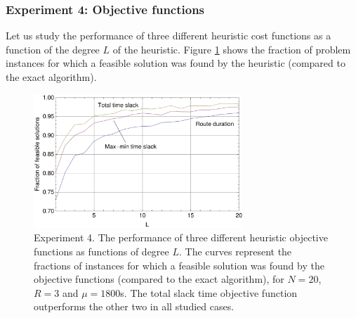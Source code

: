 \documentclass[dissertation,draft*]{aaltoseries}
\begin{document}



\subsubsection{Experiment 4: Objective functions}
Let us study the performance of three different heuristic cost functions %
as a function of the degree $L$ of the heuristic.
Figure \ref{objvertailu01} shows the fraction of problem instances for which a feasible solution was 
found by the heuristic (compared to the exact algorithm). 


\begin{figure}
\centering
\includegraphics[width=0.7\textwidth]{objvertailu01.pdf}
\caption{Experiment 4. The performance of three different heuristic objective functions as functions of degree $L$.
The curves represent the fractions of instances for which a feasible solution was found by the objective functions 
(compared to the exact algorithm), 
for $N=20$, $R=3$ and $\mu=1800$s. The total slack time objective function
outperforms the other two in all studied cases.
}
\label{objvertailu01}
\end{figure}
\end{document}
